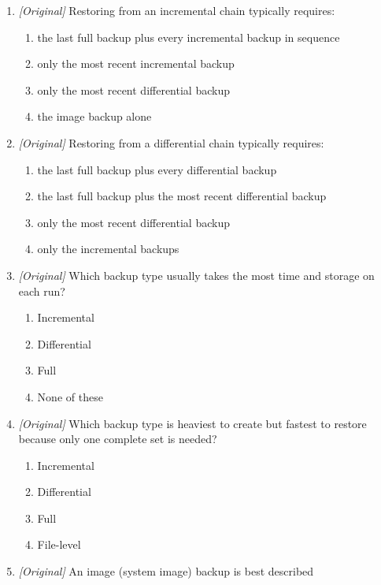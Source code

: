 \documentclass[11pt]{article}
\begin{document}
\begin{enumerate}[label=\textbf{Q\arabic*.}, leftmargin=*]
\begin{enumerate}[label=\Alph*.]
    \item Both capture changes since the last full backup.
    \item Both capture only the operating system.
  \end{enumerate}
\item \textit{[Original]} Restoring from an incremental chain typically
  requires:
  \begin{enumerate}[label=\Alph*.]
    \item the last full backup plus every incremental backup in sequence
    \item only the most recent incremental backup
    \item only the most recent differential backup
    \item the image backup alone
  \end{enumerate}
\item \textit{[Original]} Restoring from a differential chain typically
  requires:
  \begin{enumerate}[label=\Alph*.]
    \item the last full backup plus every differential backup
    \item the last full backup plus the most recent differential backup
    \item only the most recent differential backup
    \item only the incremental backups
  \end{enumerate}
\item \textit{[Original]} Which backup type usually takes the most time and
  storage on each run?
  \begin{enumerate}[label=\Alph*.]
    \item Incremental
    \item Differential
    \item Full
    \item None of these
  \end{enumerate}
\item \textit{[Original]} Which backup type is heaviest to create but
  fastest to restore because only one complete set is needed?
  \begin{enumerate}[label=\Alph*.]
    \item Incremental
    \item Differential
    \item Full
    \item File-level
  \end{enumerate}
\item \textit{[Original]} An image (system image) backup is best described

\end{enumerate}
\end{document}
